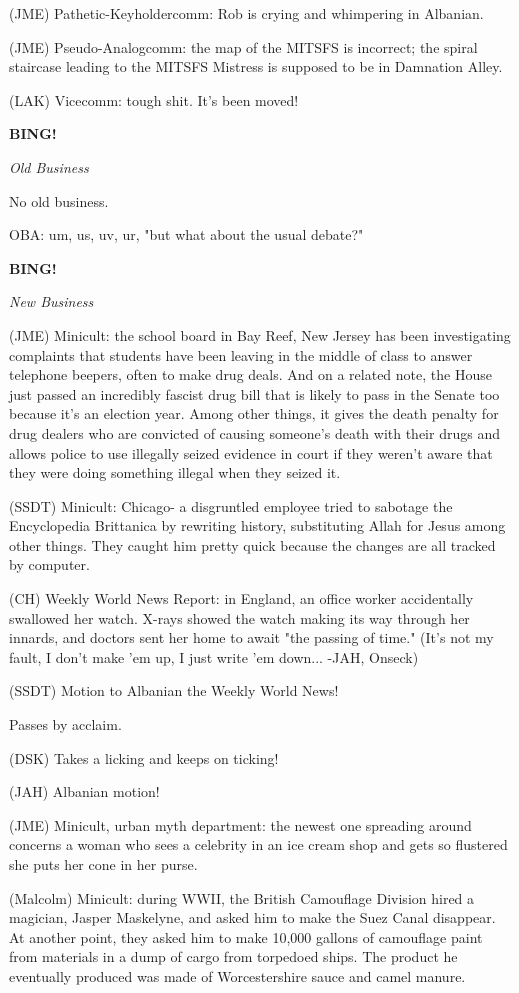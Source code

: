 \documentclass[12pt]{article}
\newcommand{\bing}{{\bf BING!} }
\newcommand{\goto}[1]{\bing \vskip 12pt \centerline{{\em{#1}}}}
\begin{document}
(JME) Pathetic-Keyholdercomm: Rob is crying and whimpering in Albanian.

(JME) Pseudo-Analogcomm: the map of the MITSFS is incorrect; the spiral staircase leading to the MITSFS Mistress is supposed to be in Damnation Alley.

(LAK) Vicecomm: tough shit. It's been moved!

\goto{Old Business}

No old business.

OBA: um, us, uv, ur, "but what about the usual debate?"

\goto{New Business}

(JME) Minicult: the school board in Bay Reef, New Jersey has been investigating complaints that students have been leaving in the middle of class to answer telephone beepers, often to make drug deals. And on a related note, the House just passed an incredibly fascist drug bill that is likely to pass in the Senate too because it's an election year. Among other things, it gives the death penalty for drug dealers who are convicted of causing someone's death with their drugs and allows police to use illegally seized evidence in court if they weren't aware that they were doing something illegal when they seized it.

(SSDT) Minicult: Chicago- a disgruntled employee tried to sabotage the Encyclopedia Brittanica by rewriting history, substituting Allah for Jesus among other things. They caught him pretty quick because the changes are all tracked by computer.

(CH) Weekly World News Report: in England, an office worker accidentally swallowed her watch. X-rays showed the watch making its way through her innards, and doctors sent her home to await "the passing of time." (It's not my fault, I don't make 'em up, I just write 'em down... -JAH, Onseck)

(SSDT) Motion to Albanian the Weekly World News!

Passes by acclaim.

(DSK) Takes a licking and keeps on ticking!

(JAH) Albanian motion!

(JME) Minicult, urban myth department: the newest one spreading around concerns a woman who sees a celebrity in an ice cream shop and gets so flustered she puts her cone in her purse.

(Malcolm) Minicult: during WWII, the British Camouflage Division hired a magician, Jasper Maskelyne, and asked him to make the Suez Canal disappear. At another point, they asked him to make 10,000 gallons of camouflage paint from materials in a dump of cargo from torpedoed ships. The product he eventually produced was made of Worcestershire sauce and camel manure.
\end{document}
